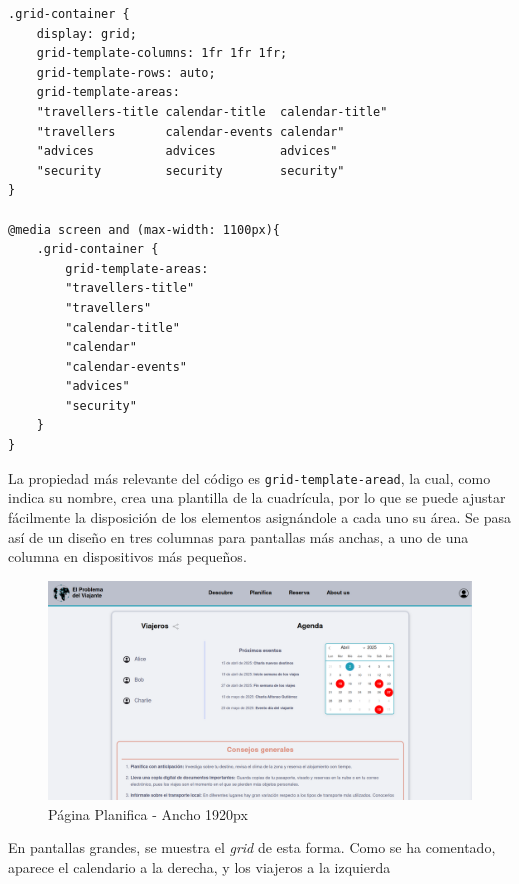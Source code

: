 \documentclass[11pt, a4paper]{book}
\begin{document}
	\begin{lstlisting}[]
.grid-container {
	display: grid;
	grid-template-columns: 1fr 1fr 1fr;
	grid-template-rows: auto;
	grid-template-areas:
	"travellers-title calendar-title  calendar-title"
	"travellers       calendar-events calendar"
	"advices          advices         advices"
	"security         security        security"
}

@media screen and (max-width: 1100px){
	.grid-container {
		grid-template-areas:
		"travellers-title"
		"travellers"
		"calendar-title"
		"calendar"
		"calendar-events"
		"advices"
		"security"
	}
}
	\end{lstlisting}

	La propiedad más relevante del código es \texttt{grid-template-aread}, la cual, como indica su nombre, crea una plantilla de la cuadrícula, por lo que se puede ajustar fácilmente la disposición de los elementos asignándole a cada uno su área. Se pasa así de un diseño en tres columnas para pantallas más anchas, a uno de una columna en dispositivos más pequeños.
	
	\begin{figure} [H]
		\centering
		\includegraphics[width=\textwidth]{CSS/2-1 1920.png}
		\caption{Página Planifica - Ancho 1920px}
	\end{figure}

	En pantallas grandes, se muestra el \textit{grid} de esta forma. Como se ha comentado, aparece el calendario a la derecha, y los viajeros a la izquierda
\end{document}

